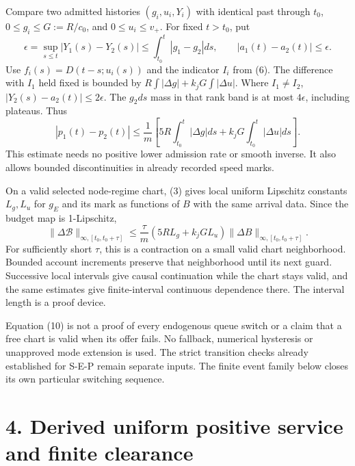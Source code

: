\documentclass[11pt,a4paper]{article}
\begin{document}
Compare two admitted histories $(g_i,u_i,Y_i)$ with identical past through
$t_0$, $0\leq g_i\leq G:=R/c_0$, and $0\leq u_i\leq v_+$.
For fixed $t>t_0$, put
\begin{equation}
 \epsilon=\sup_{s\leq t}|Y_1(s)-Y_2(s)|
       \leq\int_{t_0}^t|g_1-g_2|ds,\qquad
 |a_1(t)-a_2(t)|\leq\epsilon. \tag{8}
\end{equation}
Use $f_i(s)=D(t-s;u_i(s))$ and the indicator $I_i$ from (6).
The difference with $I_1$ held fixed is bounded by
$R\int|\Delta g|+k_jG\int|\Delta u|$. Where $I_1\ne I_2$,
$|Y_2(s)-a_2(t)|\leq2\epsilon$. The $g_2ds$ mass in that rank band
is at most $4\epsilon$, including plateaus. Thus
\begin{equation}
 |p_1(t)-p_2(t)|\leq\frac1m\left[
 5R\int_{t_0}^t|\Delta g|ds+
 k_jG\int_{t_0}^t|\Delta u|ds\right]. \tag{9}
\end{equation}
This estimate needs no positive lower admission rate or smooth inverse.
It also allows bounded discontinuities in already recorded speed marks.

On a valid selected node-regime chart, (3) gives local uniform Lipschitz
constants $L_g,L_u$ for $g_E$ and its mark as functions of $B$ with
the same arrival data. Since the budget map is 1-Lipschitz,
\begin{equation}
 \|\Delta\mathcal B\|_{\infty,[t_0,t_0+\tau]}
 \leq\frac{\tau}{m}(5RL_g+k_jGL_u)
             \|\Delta B\|_{\infty,[t_0,t_0+\tau]}. \tag{10}
\end{equation}
For sufficiently short $\tau$, this is a contraction on a small valid
chart neighborhood. Bounded account increments preserve that neighborhood
until its next guard. Successive local intervals give causal continuation
while the chart stays valid, and the same estimates give finite-interval
continuous dependence there. The interval length is a proof device.

Equation (10) is not a proof of every endogenous queue switch or a claim
that a free chart is valid when its offer fails. No fallback, numerical
hysteresis or unapproved mode extension is used. The strict transition
checks already established for S-E-P remain separate inputs. The finite
event family below closes its own particular switching sequence.

\newpage
\section*{4. Derived uniform positive service and finite clearance}
\end{document}
